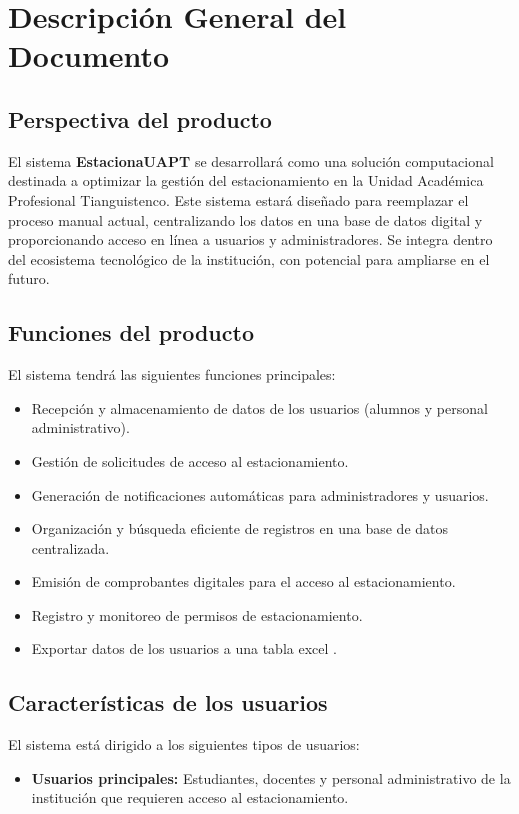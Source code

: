 {\section{Descripción General del Documento}
	\subsection{Perspectiva del producto}
	El sistema \textbf{EstacionaUAPT} se desarrollará como una solución computacional destinada a optimizar la gestión del estacionamiento en la Unidad
	Académica Profesional Tianguistenco. Este sistema estará diseñado para reemplazar el proceso manual actual, centralizando los datos en una base de datos
	digital y proporcionando acceso en línea a usuarios y administradores. Se integra dentro del ecosistema tecnológico de la institución, con potencial para
	ampliarse en el futuro.
	\subsection{Funciones del producto}
	El sistema tendrá las siguientes funciones principales:
	\begin{itemize}
		\item Recepción y almacenamiento de datos de los usuarios (alumnos y personal
		administrativo).
		\item Gestión de solicitudes de acceso al estacionamiento.
		\item Generación de notificaciones automáticas para administradores y usuarios.
		\item Organización y búsqueda eficiente de registros en una base de datos centralizada.
		\item Emisión de comprobantes digitales para el acceso al estacionamiento.
		\item Registro y monitoreo de permisos de estacionamiento.
		\item Exportar datos de los usuarios a una tabla excel .

	\end{itemize}
	\subsection{Características de los usuarios}
	El sistema está dirigido a los siguientes tipos de usuarios:
	\begin{itemize}
		
\item {\textbf{Usuarios principales:} Estudiantes, docentes y personal administrativo
de la institución que requieren acceso al estacionamiento.}


\end{itemize}}
